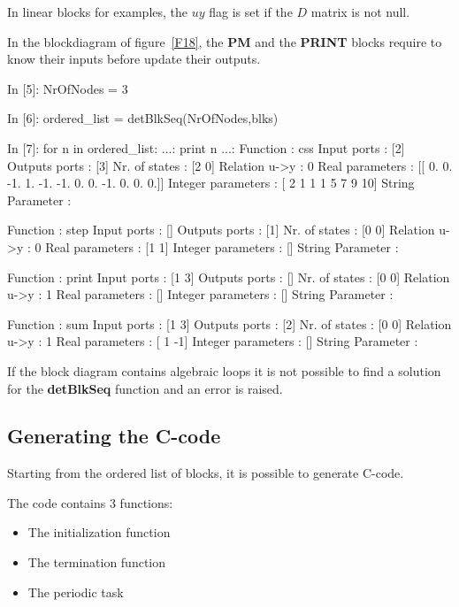 In linear blocks for examples, the $uy$ flag is set if the $D$ matrix is not 
null.

In the blockdiagram of figure~\ref{F18}, the \textbf{PM} and the 
\textbf{PRINT} blocks require to know their inputs before update their 
outputs.

\begin{code}
In [5]: NrOfNodes = 3

In [6]: ordered_list = detBlkSeq(NrOfNodes,blks)

In [7]: for n in ordered_list:
   ...:     print n
   ...:     
Function           : css
Input ports        : [2]
Outputs ports      : [3]
Nr. of states      : [2 0]
Relation u->y      : 0
Real parameters    : [[ 0.  0. -1.  1. -1. -1.  
                        0.  0. -1.  0.  0.  0.]]
Integer parameters : [ 2  1  1  1  5  7  9 10]
String Parameter   : 

Function           : step
Input ports        : []
Outputs ports      : [1]
Nr. of states      : [0 0]
Relation u->y      : 0
Real parameters    : [1 1]
Integer parameters : []
String Parameter   : 

Function           : print
Input ports        : [1 3]
Outputs ports      : []
Nr. of states      : [0 0]
Relation u->y      : 1
Real parameters    : []
Integer parameters : []
String Parameter   : 

Function           : sum
Input ports        : [1 3]
Outputs ports      : [2]
Nr. of states      : [0 0]
Relation u->y      : 1
Real parameters    : [ 1 -1]
Integer parameters : []
String Parameter   : 
\end{code}

If the block diagram contains algebraic loops it is not possible to find a 
solution for the \textbf{detBlkSeq} function and an error is raised.

\subsection{Generating the C-code}
Starting from the ordered list of blocks, it is possible to generate 
C-code.

The code contains 3 functions:

\begin{itemize}
\item The initialization function
\item The termination function
\item The periodic task
\end{itemize}

